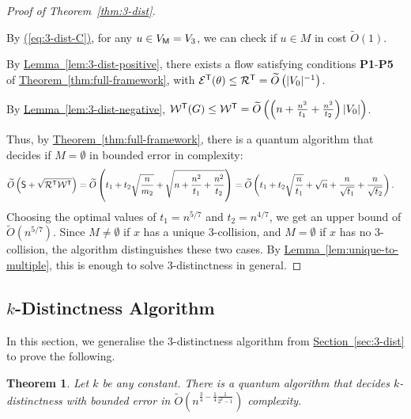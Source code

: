 \documentclass{article}
\newtheorem{theorem}{Theorem}\newtheorem{lemma}[theorem]{Lemma}\newtheorem{proposition}[theorem]{Proposition}\newtheorem{corollary}[theorem]{Corollary}\newtheorem{definition}[theorem]{Definition}\newtheorem{claim}[theorem]{Claim}\newtheorem{remark}[theorem]{Remark}\newenvironment{cfigure}[1][htbp]{\begin{figure}[#1]\centering}{\end{figure}}
\newcommand{\eq}[1]{\hyperref[eq:#1]{(\ref*{eq:#1})}}
\renewcommand{\sec}[1]{\hyperref[sec:#1]{Section~\ref*{sec:#1}}}
\newcommand{\thm}[1]{\hyperref[thm:#1]{Theorem~\ref*{thm:#1}}}
\newcommand{\lem}[1]{\hyperref[lem:#1]{Lemma~\ref*{lem:#1}}}
\renewcommand{\>}{\rangle}
\newcommand{\<}{\langle}
\renewcommand{\(}{\left(}
\renewcommand{\)}{\right)}
\begin{document}
\begin{proof}[Proof of Theorem~\ref{thm:3-dist}]
\begin{description}
\begin{description}
\end{description}

\item[Checking Subroutine:] By \eq{3-dist-C}, for any $u\in V_{\sf M}=V_3$, we can check if $u\in M$ in cost $\widetilde{O}(1)$. 
\item[Positive Condition:] By \lem{3-dist-positive}, there exists a flow satisfying conditions \textbf{P1}-\textbf{P5} of \thm{full-framework}, with ${\cal E}^{\sf T}(\theta)\leq {\cal R}^{\sf T}=\widetilde{O}\left(|V_0|^{-1} \right)$.
\item[Negative Condition:] By \lem{3-dist-negative}, ${\cal W}^{\sf T}(G)\leq {\cal W}^{\sf T}=\widetilde{O}\left(\left(n + \frac{n^2}{t_1} +\frac{n^2}{t_2}\right)|V_0|\right)$. 
\end{description}
Thus, by \thm{full-framework}, there is a quantum algorithm that decides if $M=\emptyset$ in bounded error in complexity:
\begin{align*}
\widetilde{O}\left({\sf S}+\sqrt{{\cal R}^{\sf T}{\cal W}^{\sf T}}\right) &= \widetilde{O}\left(t_1+t_2\sqrt{\frac{n}{m_2}}+\sqrt{n+\frac{n^2}{t_1}+\frac{n^2}{t_2}}\right)
=\widetilde{O}\left( t_1+t_2\sqrt{\frac{n}{t_1}}+\sqrt{n}+\frac{n}{\sqrt{t_1}}+\frac{n}{\sqrt{t_2}}\right).
\end{align*}
Choosing the optimal values of $t_1=n^{5/7}$ and $t_2=n^{4/7}$, we get an upper bound of $\widetilde{O}(n^{5/7})$.
Since $M\neq\emptyset$ if $x$ has a unique 3-collision, and $M=\emptyset$ if $x$ has no 3-collision, the algorithm distinguishes these two cases. By \lem{unique-to-multiple}, this is enough to solve 3-distinctness in general.
\end{proof}


\subsection{\texorpdfstring{$k$}{k}-Distinctness Algorithm}\label{sec:k-dist-alg}

In this section, we generalise the $3$-distinctness algorithm from \sec{3-dist} to prove the following.

\begin{theorem}\label{thm:k-dist}
	Let $k$ be any constant.
	There is a quantum algorithm that decides $k$-distinctness with bounded error in $\widetilde{O}\left(n^{\frac{3}{4}-\frac{1}{4}\frac{1}{2^k-1}}\right)$ complexity.
\end{theorem}
\end{document}
